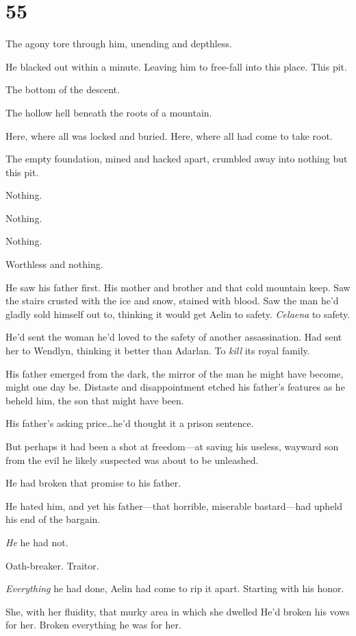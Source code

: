 
\chapter{55}

The agony tore through him, unending and depthless.

He blacked out within a minute.
Leaving him to free-fall into this place.
This pit.

The bottom of the descent.

The hollow hell beneath the roots of a mountain.

Here, where all was locked and buried.
Here, where all had come to take root.

The empty foundation, mined and hacked apart, crumbled away into nothing but this pit.

Nothing.

Nothing.

Nothing.

Worthless and nothing.

He saw his father first.
His mother and brother and that cold mountain keep.
Saw the stairs crusted with the ice and snow, stained with blood.
Saw the man he'd gladly sold himself out to, thinking it would get Aelin to safety.
\emph{Celaena} to safety.

He'd sent the woman he'd loved to the safety of another assassination.
Had sent her to Wendlyn, thinking it better than Adarlan.
To \emph{kill}
its royal family.

His father emerged from the dark, the mirror of the man he might have become, might one day be.
Distaste and disappointment etched his father's features as he beheld him, the son that might have been.

His father's asking price\ldots he'd thought it a prison sentence.

But perhaps it had been a shot at freedom---at saving his useless, wayward son from the evil he likely suspected was about to be unleashed.

He had broken that promise to his father.

He hated him, and yet his father---that horrible, miserable bastard---had upheld his end of the bargain.

\emph{He}  he had not.

Oath-breaker.
Traitor.

\emph{Everything} he had done, Aelin had come to rip it apart.
Starting with his honor.

She, with her fluidity, that murky area in which she dwelled 
He'd broken his vows for her.
Broken everything he was for her.


